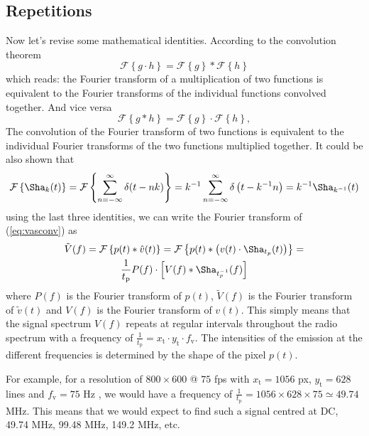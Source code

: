 \documentclass[a4paper,12pt,twoside,openright]{report}
\begin{document}
\subsection{Repetitions}
Now let's revise some mathematical identities. According to the convolution theorem \cite{arfkenconvolution}
\begin{equation}
\mathcal{F} \left\{ g \cdot h \right\} = \mathcal{F} \left\{ g \right\} \ast  \mathcal{F} \left\{ h \right\}
\end{equation}
which reads: the Fourier transform of a multiplication of two functions is equivalent to the Fourier transforms of the individual functions convolved together. And vice versa
\begin{equation}
\mathcal{F} \left\{ g \ast h \right\} = \mathcal{F} \left\{ g \right\} \cdot  \mathcal{F} \left\{ h \right\} ,
\end{equation}
The convolution of the Fourier transform of two functions is equivalent to the individual Fourier transforms of the two functions multiplied together.
It could be also shown that
\begin{equation}
\mathcal{F} \left\{ \Sha_{k} (t) \right\} = 
\mathcal{F} \left\{ \sum\limits_{n=-\infty}^{\infty}  \delta(t-n k) \right\} =
k^{-1} \sum\limits_{n=-\infty}^{\infty}  \delta \left( t-k^{-1} n \right) =
k^{-1} \Sha_{k^{-1}}(t)
\end{equation}
using the last three identities, we can write the Fourier transform of (\ref{eq:vasconv}) as
\begin{multline} 
\label{eq:vspectrum}
\tilde{V}(f) = \mathcal{F} \left\{ p(t) \ast \hat{v}(t) \right\} = \mathcal{F} \left\{ p(t) \ast \left( v(t) \cdot \Sha_{t_{p}}(t) \right) \right\} = \\
\frac{1}{t_\text{p}} P(f) \cdot  \left[ V(f) \ast
\Sha_{t_{p}^{-1}}(f)  \right]
\end{multline}
where $P(f)$ is the Fourier transform of $p(t)$, $\tilde{V}(f)$ is the Fourier transform of $\tilde{v}(t)$ and $V(f)$ is the Fourier transform of $v(t)$. This simply means that the signal spectrum $V(f)$ repeats at regular intervals throughout the radio spectrum with a frequency of $\frac{1}{t_\text{p}} = x_\text{t} \cdot y_\text{t} \cdot f_\text{v}$. The intensities of the emission at the different frequencies is determined by the shape of the pixel $p(t)$.

For example, for a resolution of $800 \times 600 $ @ $ 75$ fps with $x_\text{t} = 1056$ px, $y_\text{t} = 628$ lines and $f_\text{v} = 75$ Hz , we would have a frequency of $\frac{1}{t_\text{p}} = 1056 \times 628 \times 75 \simeq 49.74$ MHz. This means that we would expect to find such a signal centred at DC, 49.74 MHz, 99.48 MHz, 149.2 MHz, etc.
\end{document}
